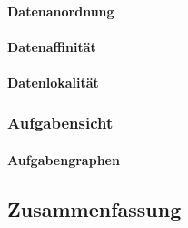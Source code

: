 \paragraph{Datenanordnung}

\paragraph{Datenaffinität}

\paragraph{Datenlokalität}

\subsubsection{Aufgabensicht}

\paragraph{Aufgabengraphen}

\subsection{Zusammenfassung}
\label{vergleich:zusammenfassung}
